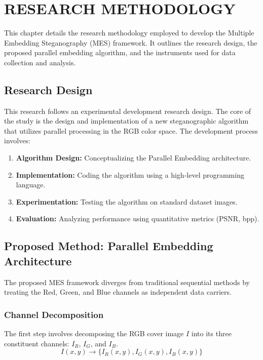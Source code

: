 \chapter{RESEARCH METHODOLOGY} \label{cap:chapter3}

This chapter details the research methodology employed to develop the Multiple Embedding Steganography (MES) framework. It outlines the research design, the proposed parallel embedding algorithm, and the instruments used for data collection and analysis.

\section{Research Design}
This research follows an experimental development research design. The core of the study is the design and implementation of a new steganographic algorithm that utilizes parallel processing in the RGB color space. The development process involves:
\begin{enumerate}
    \item \textbf{Algorithm Design:} Conceptualizing the Parallel Embedding architecture.
    \item \textbf{Implementation:} Coding the algorithm using a high-level programming language.
    \item \textbf{Experimentation:} Testing the algorithm on standard dataset images.
    \item \textbf{Evaluation:} Analyzing performance using quantitative metrics (PSNR, bpp).
\end{enumerate}

\section{Proposed Method: Parallel Embedding Architecture}
The proposed MES framework diverges from traditional sequential methods by treating the Red, Green, and Blue channels as independent data carriers.

\subsection{Channel Decomposition}
The first step involves decomposing the RGB cover image $I$ into its three constituent channels: $I_R$, $I_G$, and $I_B$.
\begin{equation}
    I(x,y) \rightarrow \{ I_R(x,y), I_G(x,y), I_B(x,y) \}
\end{equation}

